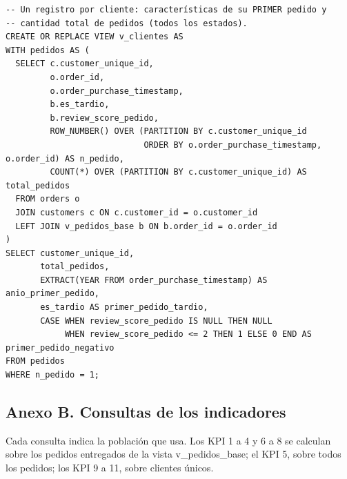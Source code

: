 \documentclass[a4paper,stu,12pt,donotrepeattitle,floatsintext]{apa7}
\begin{document}
\begin{lstlisting}
-- Un registro por cliente: características de su PRIMER pedido y
-- cantidad total de pedidos (todos los estados).
CREATE OR REPLACE VIEW v_clientes AS
WITH pedidos AS (
  SELECT c.customer_unique_id,
         o.order_id,
         o.order_purchase_timestamp,
         b.es_tardio,
         b.review_score_pedido,
         ROW_NUMBER() OVER (PARTITION BY c.customer_unique_id
                            ORDER BY o.order_purchase_timestamp, o.order_id) AS n_pedido,
         COUNT(*) OVER (PARTITION BY c.customer_unique_id) AS total_pedidos
  FROM orders o
  JOIN customers c ON c.customer_id = o.customer_id
  LEFT JOIN v_pedidos_base b ON b.order_id = o.order_id
)
SELECT customer_unique_id,
       total_pedidos,
       EXTRACT(YEAR FROM order_purchase_timestamp) AS anio_primer_pedido,
       es_tardio AS primer_pedido_tardio,
       CASE WHEN review_score_pedido IS NULL THEN NULL
            WHEN review_score_pedido <= 2 THEN 1 ELSE 0 END AS primer_pedido_negativo
FROM pedidos
WHERE n_pedido = 1;
\end{lstlisting}
\subsection{Anexo B. Consultas de los indicadores}
Cada consulta indica la población que usa. Los KPI 1 a 4 y 6 a 8 se calculan sobre los pedidos entregados de la vista v\_\allowbreak{}pedidos\_\allowbreak{}base; el KPI 5, sobre todos los pedidos; los KPI 9 a 11, sobre clientes únicos.
\end{document}

